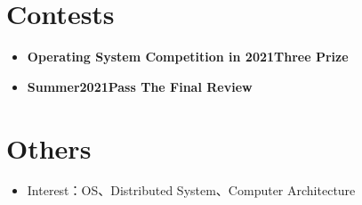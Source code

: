 \documentclass{cv}
\begin{document}
\section{Contests}
\begin{itemize}
  \item \textbf{Operating System Competition in 2021}\quad \textbf{Three Prize}
  \item \textbf{Summer2021}\quad \textbf{Pass The Final Review}
\end{itemize}

\section{Others}
\begin{itemize}
  \item Interest：OS、Distributed System、Computer Architecture
\end{itemize}
\end{document}
